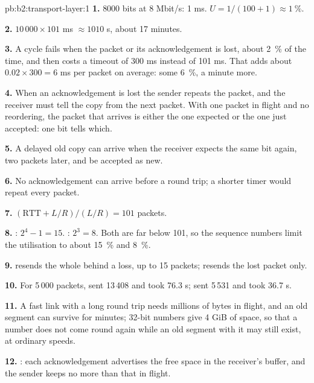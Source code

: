 \begin{solution}{pb:b2:transport-layer:1}
\textbf{1.} $8000$ bits at 8 Mbit/s: 1 ms. $U = 1/(100 + 1) \approx 1~\%$.

\textbf{2.} $10\,000 \times 101$ ms $\approx 1010$ s, about 17 minutes.

\textbf{3.} A cycle fails when the packet or its acknowledgement is lost, about 2~\% of the time, and then costs a
timeout of 300 ms instead of 101 ms. That adds about $0.02 \times 300 = 6$ ms per packet on average: some 6~\%, a
minute more.

\textbf{4.} When an acknowledgement is lost the sender repeats the packet, and the receiver must tell the copy from the
next packet. With one packet in flight and no reordering, the packet that arrives is either the one expected or the
one just accepted: one bit tells which.

\textbf{5.} A delayed old copy can arrive when the receiver expects the same bit again, two packets later, and be
accepted as new.

\textbf{6.} No acknowledgement can arrive before a round trip; a shorter timer would repeat every packet.

\textbf{7.} $(\mathrm{RTT} + L/R)/(L/R) = 101$ packets.

\textbf{8.} : $2^4 - 1 = 15$. : $2^3 = 8$. Both are far below 101, so the sequence numbers
limit the utilisation to about 15~\% and 8~\%.

\textbf{9.}  resends the whole  behind a loss, up to 15 packets;  resends the lost
packet only.

\textbf{10.} For 5\,000 packets,  sent 13\,408 and took 76.3 s;  sent 5\,531 and took 36.7 s.

\textbf{11.} A fast link with a long round trip needs millions of bytes in flight, and an old segment can survive for
minutes; 32-bit numbers give 4 GiB of space, so that a number does not come round again while an old segment with it
may still exist, at ordinary speeds.

\textbf{12.} : each acknowledgement advertises the free space in the receiver's buffer, and the sender
keeps no more than that in flight.


\end{solution}
